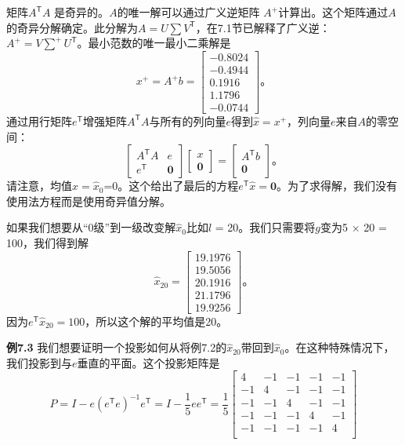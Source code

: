 \par\noindent
矩阵$A^\mathsf{T}A$ 是奇异的。$A$的唯一解可以通过广义逆矩阵 $A^\mathsf{+}$计算出。这个矩阵通过$A$的奇异分解确定。此分解为$A = U\sum V^\mathsf{T}$，在7.1节已解释了广义逆：$A^+ 
= V\sum^{+}U^\mathsf{T}$。最小范数的唯一最小二乘解是
\begin{equation*}
	x^+
	= A^{+}b
	=
	\begin{bmatrix}
		-0.8024\\
		-0.4944\\
		0.1916\\
		1.1796\\
		-0.0744
	\end{bmatrix}\text{。}
\end{equation*}
通过用行矩阵$e^\mathsf{T}$增强矩阵$A^\mathsf{T}A$与所有的列向量$e$得到$\hat{x} = x^{+}$，列向量$e$来自$A$的零空间：
\begin{equation*}
	\begin{bmatrix}
		A^\mathsf{T}A & e \\
		e^\mathsf{T} & \mathbf{0}
	\end{bmatrix}
	\begin{bmatrix}
		x\\
		\mathbf{0}
	\end{bmatrix}
	=
	\begin{bmatrix}
		A^\mathsf{T}b \\
		\mathbf{0}
	\end{bmatrix}\text{。}
\end{equation*}
请注意，均值$\hat{x} = \hat{x}_{0}$=0。这个给出了最后的方程$e^\mathsf{T}\hat{x} = \mathbf{0}$。为了求得解，我们没有使用法方程而是使用奇异值分解。
\par
如果我们想要从“0级”到一级改变解$\hat{x}_{0}$比如$l$ = 20。我们只需要将$g$变为5 $\times$ 20 = 100，我们得到解
\begin{equation*}
	\hat{x}_{20}
	=     \begin{bmatrix}
		19.1976\\
		19.5056\\
		20.1916\\
		21.1796\\
		19.9256
	\end{bmatrix}\text{。}
\end{equation*}
因为$e^\mathsf{T}\hat{x}_{20} = 100$，所以这个解的平均值是20。
\par\noindent
\textbf{例7.3} 我们想要证明一个投影如何从将例7.2的$\hat{x}_{20}$带回到$\hat{x}_{0}$。在这种特殊情况下，我们投影到与$e$垂直的平面。这个投影矩阵是
\begin{equation*}
	P
	= I - e(e^\mathsf{T}e)^{-1}e^\mathsf{T}
	= I - \frac{1}{5}ee^\mathsf{T}
	= \frac{1}{5}
	\begin{bmatrix}
		4 & -1 & -1 & -1 & -1\\
		-1 & 4  & -1 & -1 & -1\\
		-1 & -1 &  4 & -1 & -1\\
		-1 & -1 & -1 &  4 & -1\\
		-1 & -1 & -1 & -1 & 4\\
	\end{bmatrix}
\end{equation*}
